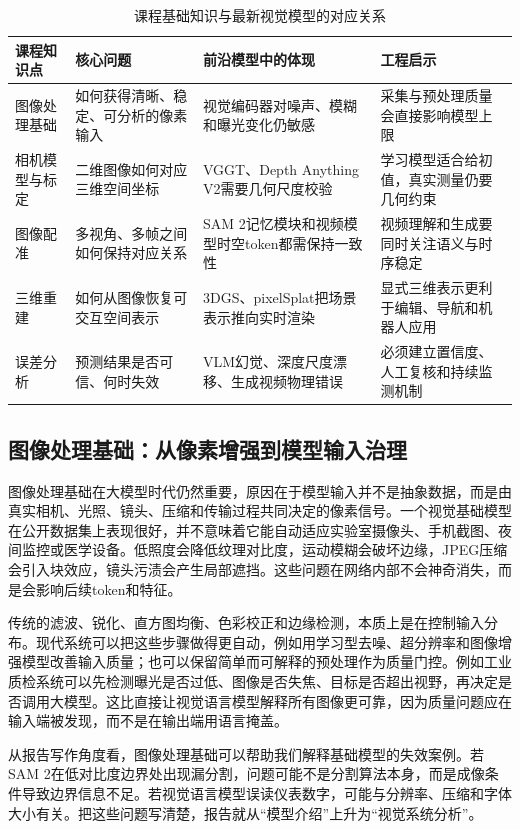 \documentclass[UTF8,a4paper,12pt]{ctexart}
\newcommand{\model}[1]{\textsf{#1}}
\begin{document}
\begin{table}[htbp]
\centering
\small
\caption{课程基础知识与最新视觉模型的对应关系}
\begin{tabularx}{\textwidth}{C{2.5cm}Y Y Y}
\toprule
\textbf{课程知识点} & \textbf{核心问题} & \textbf{前沿模型中的体现} & \textbf{工程启示} \\
\midrule
图像处理基础 & 如何获得清晰、稳定、可分析的像素输入 & 视觉编码器对噪声、模糊和曝光变化仍敏感 & 采集与预处理质量会直接影响模型上限 \\
相机模型与标定 & 二维图像如何对应三维空间坐标 & \model{VGGT}、\model{Depth Anything V2}需要几何尺度校验 & 学习模型适合给初值，真实测量仍要几何约束 \\
图像配准 & 多视角、多帧之间如何保持对应关系 & \model{SAM 2}记忆模块和视频模型时空token都需保持一致性 & 视频理解和生成要同时关注语义与时序稳定 \\
三维重建 & 如何从图像恢复可交互空间表示 & \model{3DGS}、\model{pixelSplat}把场景表示推向实时渲染 & 显式三维表示更利于编辑、导航和机器人应用 \\
误差分析 & 预测结果是否可信、何时失效 & VLM幻觉、深度尺度漂移、生成视频物理错误 & 必须建立置信度、人工复核和持续监测机制 \\
\bottomrule
\end{tabularx}
\end{table}

\subsection{图像处理基础：从像素增强到模型输入治理}
图像处理基础在大模型时代仍然重要，原因在于模型输入并不是抽象数据，而是由真实相机、光照、镜头、压缩和传输过程共同决定的像素信号。一个视觉基础模型在公开数据集上表现很好，并不意味着它能自动适应实验室摄像头、手机截图、夜间监控或医学设备。低照度会降低纹理对比度，运动模糊会破坏边缘，JPEG压缩会引入块效应，镜头污渍会产生局部遮挡。这些问题在网络内部不会神奇消失，而是会影响后续token和特征。

传统的滤波、锐化、直方图均衡、色彩校正和边缘检测，本质上是在控制输入分布。现代系统可以把这些步骤做得更自动，例如用学习型去噪、超分辨率和图像增强模型改善输入质量；也可以保留简单而可解释的预处理作为质量门控。例如工业质检系统可以先检测曝光是否过低、图像是否失焦、目标是否超出视野，再决定是否调用大模型。这比直接让视觉语言模型解释所有图像更可靠，因为质量问题应在输入端被发现，而不是在输出端用语言掩盖。

从报告写作角度看，图像处理基础可以帮助我们解释基础模型的失效案例。若\model{SAM 2}在低对比度边界处出现漏分割，问题可能不是分割算法本身，而是成像条件导致边界信息不足。若视觉语言模型误读仪表数字，可能与分辨率、压缩和字体大小有关。把这些问题写清楚，报告就从“模型介绍”上升为“视觉系统分析”。
\end{document}
